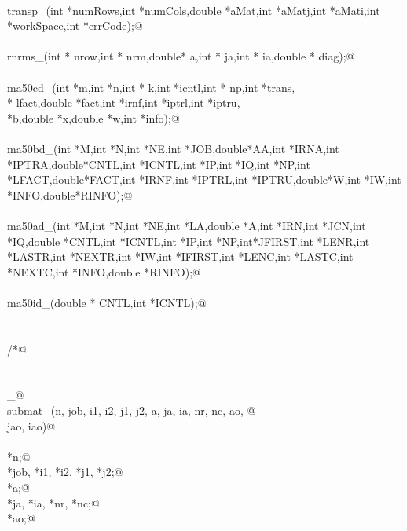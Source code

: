 \documentclass[12pt]{article}
\begin{document}
\begin{flushleft}
\begin{minipage}{\linewidth}
\begin{list}{}{}
\mbox{}\verb@@\\
\mbox{}\verb@void transp_(int *numRows,int *numCols,double *aMat,int *aMatj,int *aMati,int *workSpace,int *errCode);@\\
\mbox{}\verb@@\\
\mbox{}\verb@int rnrms_(int * nrow,int * nrm,double* a,int * ja,int * ia,double * diag);@\\
\mbox{}\verb@@\\
\mbox{}\verb@void ma50cd_(int *m,int *n,int * k,int *icntl,int * np,int *trans,\@\\
\mbox{}\verb@int * lfact,double *fact,int *irnf,int *iptrl,int *iptru,\@\\
\mbox{}\verb@double *b,double *x,double *w,int *info);@\\
\mbox{}\verb@@\\
\mbox{}\verb@void ma50bd_(int *M,int *N,int *NE,int *JOB,double*AA,int *IRNA,int *IPTRA,double*CNTL,int *ICNTL,int *IP,int *IQ,int *NP,int *LFACT,double*FACT,int *IRNF,int *IPTRL,int *IPTRU,double*W,int *IW,int *INFO,double*RINFO);@\\
\mbox{}\verb@@\\
\mbox{}\verb@void ma50ad_(int *M,int *N,int *NE,int *LA,double *A,int *IRN,int *JCN,int *IQ,double *CNTL,int *ICNTL,int *IP,int *NP,int*JFIRST,int *LENR,int *LASTR,int *NEXTR,int *IW,int *IFIRST,int *LENC,int *LASTC,int *NEXTC,int *INFO,double *RINFO);@\\
\mbox{}\verb@@\\
\mbox{}\verb@void ma50id_(double * CNTL,int *ICNTL);@\\
\mbox{}\verb@@\\
\mbox{}\verb@@\\
\mbox{}\verb@/*@\\
\mbox{}\verb@@\\
\mbox{}\verb@@\\
\mbox{}\verb@submat_@\\
\mbox{}\verb@int submat_(n, job, i1, i2, j1, j2, a, ja, ia, nr, nc, ao, @\\
\mbox{}\verb@        jao, iao)@\\
\mbox{}\verb@@\\
\mbox{}\verb@integer *n;@\\
\mbox{}\verb@integer *job, *i1, *i2, *j1, *j2;@\\
\mbox{}\verb@doublereal *a;@\\
\mbox{}\verb@integer *ja, *ia, *nr, *nc;@\\
\mbox{}\verb@doublereal *ao;@\\

\end{list}
\end{minipage}
\end{flushleft}
\end{document}
